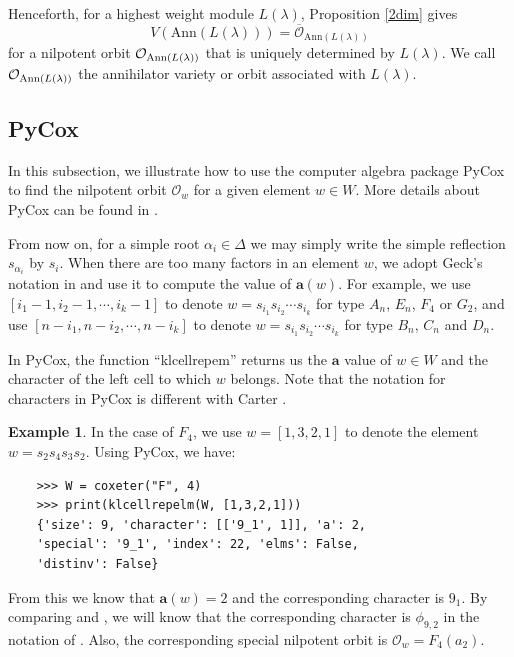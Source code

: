 \documentclass[reqno,12pt]{amsart}
\numberwithin{equation}{section}
\theoremstyle{plain}
\newtheorem{Prop}[Thm]{Proposition}
\theoremstyle{definition}
\newtheorem{ex}[Thm]{Example}
\newcommand{\lam}{\lambda}
\newcommand{\Ann}{\mathrm{Ann}}
\newcommand{\aff}{ \mathbf{a} }
\newcommand{\gkd}{\operatorname{GKdim}}
\begin{document}
    
 Henceforth, for a highest weight module $L(\lambda)$, Proposition \ref{2dim} gives 
 $$V(\Ann (L(\lambda)))=\overline{\mathcal{O}}_{\Ann(L(\lambda))}$$
 for a nilpotent orbit $\mathcal{O}_{{\rm Ann}(L(\lambda))}$ that is uniquely determined by $L(\lambda)$. We call $\mathcal{O}_{{\rm Ann}(L(\lambda))}$ the annihilator variety or orbit associated with $L(\lambda)$.
 
\subsection{PyCox}
In this subsection, we  illustrate how to use the computer algebra package PyCox  to find the nilpotent orbit $\mathcal{O}_w$ for a given element $w\in W$. More details about PyCox can be found in \cite{ge}.

From now on, for a simple root $\alpha_i\in \Delta$ we may simply write the simple reflection $s_{\alpha_i}$ by $s_i$. 
 When there are too many factors in an element $w$, we  adopt Geck's notation in \cite{ge} and use it to compute the value of $\aff(w)$. For example, we use $[i_1-1,i_2-1,\cdots,i_k-1]$ to denote
$ w=s_{i_1}s_{i_2}\cdots s_{i_k}$ for type $A_n$, $E_n$, $F_4$ or $G_2$, and use $[n-i_1,n-i_2,\cdots,n-i_k]$ to denote
$ w=s_{i_1}s_{i_2}\cdots s_{i_k}$ for type $B_n$, $C_n$ and $D_n$.




In PyCox, the function ``klcellrepem''   returns us the 
 $\aff$ value of $w \in W$ and the character of the left cell to which $w$ belongs. Note that the notation for characters in PyCox is different with Carter \cite[p. 428]{Ca85}. 

\begin{ex}
    In the case of $F_4$, we use $w=[1,3,2,1]$ to denote the element $w=s_2s_4s_3s_2$. Using PyCox, we have:
   \begin{verbatim}
    >>> W = coxeter("F", 4)
    >>> print(klcellrepelm(W, [1,3,2,1]))
    {'size': 9, 'character': [['9_1', 1]], 'a': 2,
    'special': '9_1', 'index': 22, 'elms': False, 
    'distinv': False}
\end{verbatim}

From this we know that $\aff(w)=2$ and the corresponding character is $9_1$. By comparing \cite[Table C.3]{GP} and \cite[p. 428]{Ca85}, we will know that the corresponding character is  $\phi_{9,2}$ in the notation of \cite[p. 428]{Ca85}. Also, the corresponding special nilpotent orbit is $\mathcal{O}_w=F_4(a_2)$.
\end{ex}
 
\end{document}
